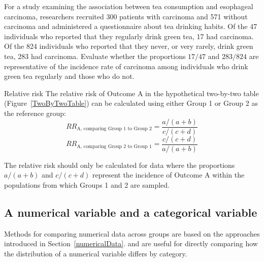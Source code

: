 \begin{exercisewrap}
\begin{nexercise}
For a study examining the association between tea consumption and esophageal carcinoma, researchers recruited 300 patients with carcinoma and 571 without carcinoma and administered a questionnaire about tea drinking habits.\footnotemark{} Of the 47 individuals who reported that they regularly drink green tea, 17 had carcinoma. Of the 824 individuals who reported that they never, or very rarely, drink green tea, 283 had carcinoma. Evaluate whether the proportions $17/47$ and $283/824$ are representative of the incidence rate of carcinoma among individuals who drink green tea regularly and those who do not.\footnotemark{}
\end{nexercise}
\end{exercisewrap}
\addtocounter{footnote}{-1}%
%
\addtocounter{footnote}{1}%

\begin{onebox}{Relative risk}%
		The relative risk of Outcome A in the hypothetical two-by-two table (Figure~\ref{TwoByTwoTable}) can be calculated using either Group 1 or Group 2 as the reference group:
		\[RR_{\textrm{A, comparing Group 1 to Group 2}} = \dfrac{a/(a+b)}{c/(c+d)} \]
		\[RR_{\textrm{A, comparing Group 2 to Group 1}} = \dfrac{c/(c+d)}{a/(a+b)} \]
		
		The relative risk should only be calculated for data where the proportions $a/(a+b)$ and $c/(c+d)$ represent the incidence of Outcome A within the populations from which Groups 1 and 2 are sampled.
\end{onebox}

\subsection{A numerical variable and a categorical variable}
\label{comparingAcrossGroups}

Methods for comparing numerical data across groups are based on the approaches introduced in Section~\ref{numericalData}.  and  are useful for directly comparing how the distribution of a numerical variable differs by category. 


